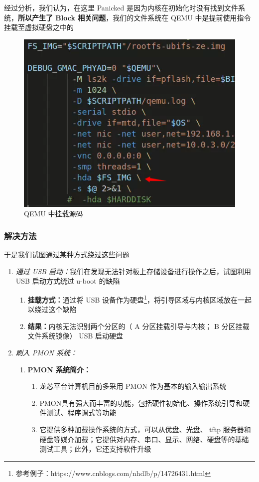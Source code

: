 经过分析，我们认为，在这里 Panicked 是因为内核在初始化时没有找到文件系统，\textbf{所以产生了 Block 相关问题}，我们的文件系统在 QEMU 中是提前使用指令挂载至虚拟硬盘之中的

\begin{figure}[htbp]
	\centering
	\includegraphics[width=0.5\linewidth]{figs/hda.png}
	\caption{QEMU 中挂载源码}
	\label{information of bug}
\end{figure}

\subsubsection{解决方法}

于是我们试图通过某种方式绕过这些问题

\begin{enumerate}
	\item \textit{通过 USB 启动：}我们在发现无法针对板上存储设备进行操作之后，试图利用 USB 启动方式绕过 u-boot 的缺陷
	\begin{enumerate}
		\item \textbf{挂载方式：}通过将 USB 设备作为硬盘\footnote{参考例子：https://www.cnblogs.com/nhdlb/p/14726431.html}，将引导区域与内核区域放在一起以绕过这个缺陷
		\item \textbf{结果：}内核无法识别两个分区的（ A 分区挂载引导与内核； B 分区挂载文件系统镜像） USB 启动硬盘
	\end{enumerate}
	\item \textit{刷入 PMON 系统：}
	\begin{enumerate}
		\item \textbf{PMON 系统简介：}
		\begin{enumerate}
			\item 龙芯平台计算机目前多采用 PMON 作为基本的输入输出系统
			\item PMON具有强大而丰富的功能，包括硬件初始化、操作系统引导和硬件测试、程序调式等功能
			\item 它提供多种加载操作系统的方式，可以从优盘、光盘、 tftp 服务器和硬盘等媒介加载；它提供对内存、串口、显示、网络、硬盘等的基础测试工具；此外，它还支持软件升级
		\end{enumerate}
	\end{enumerate}
\end{enumerate}